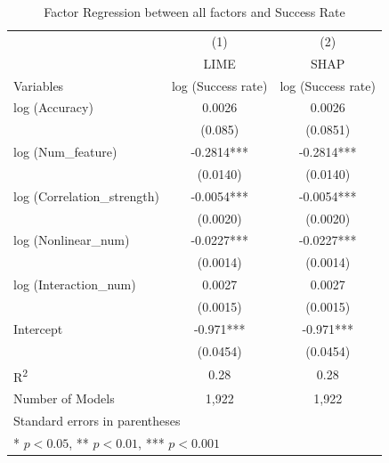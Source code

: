 \documentclass{article}
\begin{document}
\begin{table}[h]
\centering
\caption{Factor Regression between all factors and Success Rate}
\begin{tabular}{lcc}
\toprule
 & (1) & (2) \\
 & LIME & SHAP \\

Variables & log (Success rate) & log (Success rate) \\
\midrule
log (Accuracy) & 0.0026 & 0.0026 \\
 & (0.085) & (0.0851) \\
log (Num\_feature) & -0.2814*** & -0.2814*** \\
 & (0.0140) & (0.0140) \\
log (Correlation\_strength) & -0.0054*** & -0.0054*** \\
 & (0.0020) & (0.0020) \\
log (Nonlinear\_num) & -0.0227*** & -0.0227*** \\
 & (0.0014) & (0.0014) \\
log (Interaction\_num) & 0.0027 & 0.0027 \\
 & (0.0015) & (0.0015) \\
Intercept & -0.971*** & -0.971*** \\
 & (0.0454) & (0.0454) \\
\midrule
R\textsuperscript{2} & 0.28 & 0.28 \\
Number of Models & 1,922 & 1,922 \\
\bottomrule
\multicolumn{3}{l}{Standard errors in parentheses} \\
\multicolumn{3}{l}{* $p<0.05$, ** $p<0.01$, *** $p<0.001$} \\
\end{tabular}
\end{table}
\end{document}
